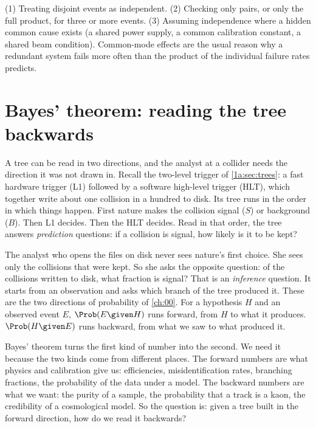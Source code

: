 \begin{pitfall}
(1) Treating disjoint events as independent. (2) Checking only pairs, or only
the full product, for three or more events. (3) Assuming independence where a
hidden common cause exists (a shared power supply, a common calibration
constant, a shared beam condition). Common-mode effects are the usual reason
why a redundant system fails more often than the product of the individual
failure rates predicts.
\end{pitfall}

\section{Bayes' theorem: reading the tree backwards}
\label{1a:sec:bayes}

A tree can be read in two directions, and the analyst at a collider needs the
direction it was not drawn in. Recall the two-level trigger of
\cref{1a:sec:trees}: a fast hardware trigger (L1) followed by a software
high-level trigger (HLT), which together write about one collision in a
hundred to disk. Its tree runs in the order in which things happen. First
nature makes the collision signal ($S$) or background ($B$). Then L1 decides.
Then the HLT decides. Read in that order, the tree answers
\emph{prediction} questions: if a collision is signal, how likely is it to be
kept?

The analyst who opens the files on disk never sees nature's first choice. She
sees only the collisions that were kept. So she asks the opposite question: of
the collisions written to disk, what fraction is signal? That is an
\emph{inference} question. It starts from an observation and asks which branch
of the tree produced it. These are the two directions of probability of
\cref{ch:00}. For a hypothesis $H$ and an observed event $E$, $\Prob(E\given H)$
runs forward, from $H$ to what it produces. $\Prob(H\given E)$ runs backward,
from what we saw to what produced it.

Bayes' theorem turns the first kind of number into the second. We need it
because the two kinds come from different places. The forward numbers are what
physics and calibration give us: efficiencies, misidentification rates,
branching fractions, the probability of the data under a model. The backward
numbers are what we want: the purity of a sample, the probability that a track
is a kaon, the credibility of a cosmological model. So the question is: given a
tree built in the forward direction, how do we read it backwards?

